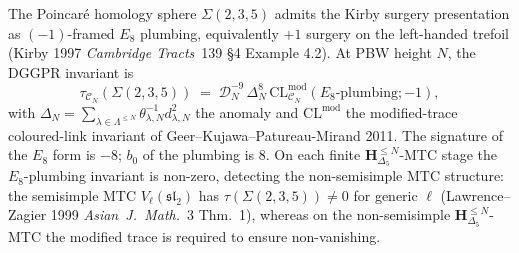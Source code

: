 \begin{theorem}
\label{thm:modtr-rt-poincare}
The Poincar\'e homology sphere $\Sigma(2, 3, 5)$ admits the Kirby
surgery presentation as $(-1)$-framed $E_8$ plumbing, equivalently
$+1$ surgery on the left-handed trefoil
(Kirby 1997 \emph{Cambridge Tracts}~139 \S 4 Example 4.2). At PBW
height \(N\), the DGGPR invariant is
\[
 \tau_{\mathcal C_N}(\Sigma(2, 3, 5))
 \;=\;
 \mathcal D_N^{-9}\,\Delta_N^{8}\,
 \mathrm{CL}^{\mathrm{mod}}_{\mathcal C_N}(E_8\text{-plumbing}; -1),
\]
with
\(\Delta_N = \sum_{\lambda\in\Lambda^{\leq N}}
\theta_{\lambda,N}^{-1} d_{\lambda,N}^2\) the anomaly and
\(\mathrm{CL}^{\mathrm{mod}}\) the modified-trace
coloured-link invariant of Geer--Kujawa--Patureau-Mirand 2011. The
signature of the $E_8$ form is $-8$; $b_0$ of the plumbing is $8$.
On each finite \(\mathbf H_{\Delta_5}^{\leq N}\)-MTC stage the
\(E_8\)-plumbing invariant is
non-zero, detecting the non-semisimple MTC
structure: the semisimple MTC $V_\ell(\mathfrak{sl}_2)$ has
$\tau(\Sigma(2,3,5))\neq 0$ for generic $\ell$
(Lawrence--Zagier 1999 \emph{Asian~J.~Math.}~3 Thm.~1), whereas on
the non-semisimple \(\mathbf H_{\Delta_5}^{\leq N}\)-MTC the modified
trace is required to ensure non-vanishing.
\end{theorem}

